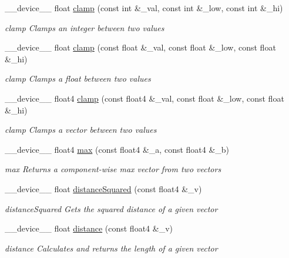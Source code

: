 \begin{DoxyCompactItemize}
\-\_\-\-\_\-device\-\_\-\-\_\- float \hyperlink{MathHelpers_8cuh_a9e940177924516937ce79892653e50fd}{clamp} (const int \&\-\_\-val, const int \&\-\_\-low, const int \&\-\_\-hi)
\begin{DoxyCompactList}\small\item\em clamp Clamps an integer between two values \end{DoxyCompactList}\item 
\-\_\-\-\_\-device\-\_\-\-\_\- float \hyperlink{MathHelpers_8cuh_a2a072dabd84a1dfb096792d5eb0d7601}{clamp} (const float \&\-\_\-val, const float \&\-\_\-low, const float \&\-\_\-hi)
\begin{DoxyCompactList}\small\item\em clamp Clamps a float between two values \end{DoxyCompactList}\item 
\-\_\-\-\_\-device\-\_\-\-\_\- float4 \hyperlink{MathHelpers_8cuh_a1f38a602055e97b6ea06e2b2da3e6772}{clamp} (const float4 \&\-\_\-val, const float \&\-\_\-low, const float \&\-\_\-hi)
\begin{DoxyCompactList}\small\item\em clamp Clamps a vector between two values \end{DoxyCompactList}\item 
\-\_\-\-\_\-device\-\_\-\-\_\- float4 \hyperlink{MathHelpers_8cuh_ab63a29e23d6a3a7f99f537d1f73bc659}{max} (const float4 \&\-\_\-a, const float4 \&\-\_\-b)
\begin{DoxyCompactList}\small\item\em max Returns a component-\/wise max vector from two vectors \end{DoxyCompactList}\item 
\-\_\-\-\_\-device\-\_\-\-\_\- float \hyperlink{MathHelpers_8cuh_adb5b67ae0abd3db51000d69d0d0d9b85}{distance\-Squared} (const float4 \&\-\_\-v)
\begin{DoxyCompactList}\small\item\em distance\-Squared Gets the squared distance of a given vector \end{DoxyCompactList}\item 
\-\_\-\-\_\-device\-\_\-\-\_\- float \hyperlink{MathHelpers_8cuh_a02992387188f814d8d426432e9dc40e8}{distance} (const float4 \&\-\_\-v)
\begin{DoxyCompactList}\small\item\em distance Calculates and returns the length of a given vector \end{DoxyCompactList}\item 

\end{DoxyCompactItemize}
